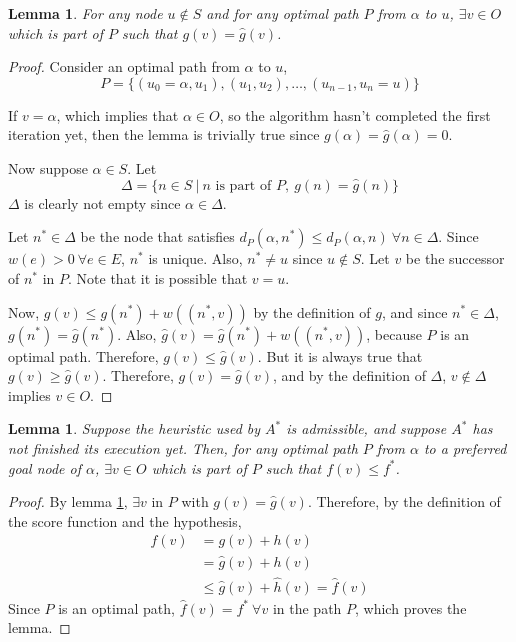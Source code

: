 \documentclass[a4paper,10pt]{report}
\newtheorem{lemma}[theorem]{Lemma}
\begin{document}
\begin{lemma}
\label{lemma:astar1}
For any node $u \not \in S$ and for any optimal path $P$ from $\alpha$ to $u$, $\exists v \in O$ which is part of $P$ such that $g(v) = \hat{g}(v)$.
\end{lemma}
\begin{proof}
Consider an optimal path from $\alpha$ to $u$,
\[P = \{ (u_0 = \alpha, u_1), (u_1, u_2), \dots, (u_{n-1}, u_n = u) \}\]

If $v = \alpha$, which implies that $\alpha \in O$, so the algorithm hasn't completed the first iteration yet, then the lemma is trivially true since $g(\alpha) = \hat{g}(\alpha) = 0$.

Now suppose $\alpha \in S$. Let
\[ \Delta = \{ n \in S \  | \  n \text{ is part of } P,\  g(n) = \hat{g}(n) \} \]
$\Delta$ is clearly not empty since $\alpha \in \Delta$.

Let $n^* \in \Delta$ be the node that satisfies $d_P(\alpha, n^*) \leq d_P(\alpha, n) \  \forall n \in \Delta$. Since $w(e) > 0\  \forall e \in E$, $n^*$ is unique. Also, $n^* \neq u$ since $u \not \in S$. Let $v$ be the successor of $n^*$ in $P$. Note that it is possible that $v = u$.

Now, $g(v) \leq g(n^*) + w((n^*, v))$ by the definition of $g$, and since $n^* \in \Delta$, $g(n^*) = \hat{g}(n^*)$. Also, $\hat{g}(v) = \hat{g}(n^*) + w((n^*, v))$, because $P$ is an optimal path. Therefore, $g(v) \leq \hat{g}(v)$. But it is always true that $g(v) \geq \hat{g}(v)$. Therefore, $g(v) = \hat{g}(v)$, and by the definition of $\Delta$, $v \not \in \Delta$ implies $v \in O$.
\end{proof}

\begin{lemma}
\label{lemma:astar2}
Suppose the heuristic used by $A^*$ is admissible, and suppose $A^*$ has not finished its execution yet. Then, for any optimal path $P$ from $\alpha$ to a preferred goal node of $\alpha$, $\exists v \in O$ which is part of $P$ such that $f(v) \leq f^*$.
\end{lemma}
\begin{proof}
By lemma \ref{lemma:astar1}, $\exists v$ in $P$ with $g(v) = \hat{g}(v)$. Therefore, by the definition of the score function and the hypothesis,
\begin{align*}
f(v) &= g(v) + h(v)\\
&= \hat{g}(v) + h(v)\\
&\leq \hat{g}(v) + \hat{h}(v) = \hat{f}(v)
\end{align*}
Since $P$ is an optimal path, $\hat{f}(v) = f^* \  \forall v$ in the path $P$, which proves the lemma.
\end{proof}
\end{document}
